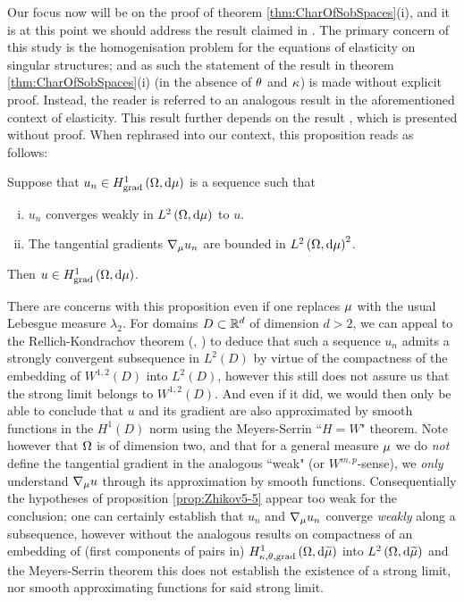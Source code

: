 Our focus now will be on the proof of theorem \ref{thm:CharOfSobSpaces}(i), and it is at this point we should address the result claimed in \cite{zhikov2002homogenization}.
The primary concern of this study is the homogenisation problem for the equations of elasticity on singular structures; and as such the statement of the result in theorem \ref{thm:CharOfSobSpaces}(i) (in the absence of $\theta$ and $\kappa$) is made without explicit proof.
Instead, the reader is referred to an analogous result \cite[lemma 6.1]{zhikov2002homogenization} in the aforementioned context of elasticity.
This result further depends on the result \cite[proposition 5.5]{zhikov2002homogenization}, which is presented without proof.
When rephrased into our context, this proposition reads as follows:
\begin{prop} \label{prop:Zhikov5-5}
	Suppose that $u_n\in H^1_\mathrm{grad}\left( \Omega, \mathrm{d}\mu \right)$ is a sequence such that
	\begin{enumerate}[(i)]
		\item $u_n$ converges weakly in $L^{2}\left( \Omega,\mathrm{d} \mu \right)$ to $u$.
		\item The tangential gradients $\nabla_{\mu}u_n$ are bounded in $L^{2}\left( \Omega,\mathrm{d} \mu \right)^2$.
	\end{enumerate}
	Then $u\in H^1_\mathrm{grad}\left( \Omega, \mathrm{d}\mu \right)$.
\end{prop}
There are concerns with this proposition even if one replaces $\mu$ with the usual Lebesgue measure $\lambda_2$.
For domains $D\subset\mathbb{R}^d$ of dimension $d>2$, we can appeal to the Rellich-Kondrachov theorem (\cite[section 5.7, theorem 1]{evans2010partial}, \cite[chapter 6]{adams2003sobolev}) to deduce that such a sequence $u_n$ admits a strongly convergent subsequence in $L^2(D)$ by virtue of the compactness of the embedding of $W^{1,2}(D)$ into $L^2(D)$, however this still does not assure us that the strong limit belongs to $W^{1,2}(D)$.
And even if it did, we would then only be able to conclude that $u$ and its gradient are  also approximated by smooth functions in the $H^1(D)$ norm using the Meyers-Serrin ``$H=W$" theorem.
Note however that $\Omega$ is of dimension two, and that for a general measure $\mu$ we do \emph{not} define the tangential gradient in the analogous ``weak" (or $W^{m,p}$-sense), we \emph{only} understand $\nabla_{\mu}u$ through its approximation by smooth functions.
Consequentially the hypotheses of proposition \ref{prop:Zhikov5-5} appear too weak for the conclusion; one can certainly establish that $u_n$ and $\nabla_{\mu}u_n$ converge \emph{weakly} along a subsequence, however without the analogous results on compactness of an embedding of (first components of pairs in) $H^1_{\kappa,\theta,\mathrm{grad}}\left( \Omega, \mathrm{d}\widetilde{\mu} \right)$ into $L^{2}\left( \Omega,\mathrm{d} \widetilde{\mu} \right)$ and the Meyers-Serrin theorem this does not establish the existence of a strong limit, nor smooth approximating functions for said strong limit.
